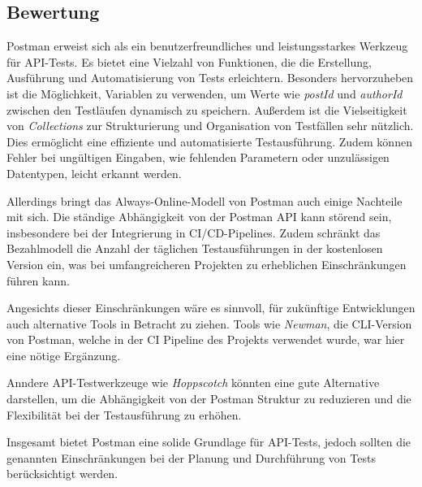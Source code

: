 \subsection{Bewertung}

Postman erweist sich als ein benutzerfreundliches und leistungsstarkes Werkzeug für API-Tests. 
Es bietet eine Vielzahl von Funktionen, die die Erstellung, Ausführung und Automatisierung von Tests erleichtern. 
Besonders hervorzuheben ist die Möglichkeit, Variablen zu verwenden, 
um Werte wie \textit{postId} und \textit{authorId} zwischen den Testläufen dynamisch zu speichern.
Außerdem ist die Vielseitigkeit von \textit{Collections} zur Strukturierung und Organisation von Testfällen sehr nützlich.
Dies ermöglicht eine effiziente und automatisierte Testausführung. 
Zudem können Fehler bei ungültigen Eingaben, wie fehlenden Parametern oder unzulässigen Datentypen, leicht erkannt werden.

Allerdings bringt das Always-Online-Modell von Postman auch einige Nachteile mit sich. 
Die ständige Abhängigkeit von der Postman API kann störend sein, insbesondere bei der Integrierung in \ac{CI}/\ac{CD}-Pipelines.
Zudem schränkt das Bezahlmodell die Anzahl der täglichen Testausführungen in der kostenlosen Version ein, 
was bei umfangreicheren Projekten zu erheblichen Einschränkungen führen kann.

Angesichts dieser Einschränkungen wäre es sinnvoll, für zukünftige Entwicklungen auch alternative Tools in Betracht zu ziehen. 
Tools wie \textit{Newman}, die CLI-Version von Postman, welche in der \ac{CI} Pipeline des Projekts verwendet wurde,
war hier eine nötige Ergänzung.

Anndere API-Testwerkzeuge wie \textit{Hoppscotch} könnten eine gute Alternative darstellen, 
um die Abhängigkeit von der Postman Struktur zu reduzieren und die Flexibilität bei der Testausführung zu erhöhen.

Insgesamt bietet Postman eine solide Grundlage für API-Tests, 
jedoch sollten die genannten Einschränkungen bei der Planung und Durchführung von Tests berücksichtigt werden.
